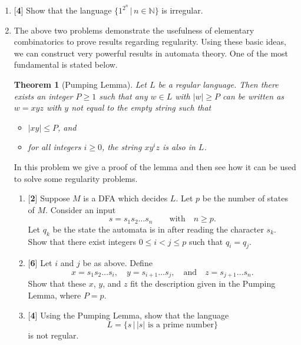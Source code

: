 \documentclass[11pt]{article}
\newtheorem{thm}{Theorem}[section]
\newcounter{enum}
\begin{document}
\begin{enumerate}
\setcounter{enumi}{\theenum}

\item {[}\textbf{4}{]} Show that the language $\{1^{2^n}\,|\,n\in\mathbb{N}\}$ is irregular.

\item The above two problems demonstrate the usefulness of elementary combinatorics to prove results regarding regularity.  Using these basic ideas, we can construct very powerful results in automata theory.  One of the most fundamental is stated below.

\begin{thm}[Pumping Lemma] Let $L$ be a regular language.  Then there exists an integer $P\geq 1$ such that any $w\in L$ with $|w|\geq P$ can be written as $w=xyz$ with $y$ not equal to the empty string such that

\begin{itemize}

\item $|xy|\leq P$, and

\item for all integers $i\geq 0$, the string $xy^iz$ is also in $L$.

\end{itemize}
\end{thm}

In this problem we give a proof of the lemma and then see how it can be used to solve some regularity problems.

\begin{enumerate}

\item {[}\textbf{2}{]} Suppose $M$ is a DFA which decides $L$.  Let $p$ be the number of states of $M$.  Consider an input \[s=s_1s_2\ldots s_n\qquad\text{with}\quad n\geq p.\] Let $q_k$ be the state the automata is in after reading the character $s_k$.  Show that there exist integers $0\leq i < j\leq p$ such that $q_i=q_j$.

\item {[}\textbf{6}{]} Let $i$ and $j$ be as above.  Define \[x=s_1s_2\ldots s_i,\quad y=s_{i+1}\ldots s_j,\quad\text{and}\quad z = s_{j+1}\ldots s_n.\] Show that these $x$, $y$, and $z$ fit the description given in the Pumping Lemma, where $P=p$.

\item {[}\textbf{4}{]} Using the Pumping Lemma, show that the language \[L=\{s\,|\,|s|\text{ is a prime number}\}\] is not regular.


\end{enumerate}
\end{enumerate}
\end{document}
